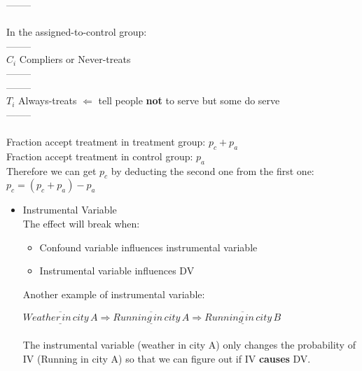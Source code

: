 \begin{itemize}
    \hspace*{0.4cm}  --------\\  
     \\
    In the assigned-to-control group:\\
    \hspace*{0.4cm}  --------\\
    \hspace*{0.4cm} \textbar \textbar \textbar \textbar \textbar $C_i$ \hspace{0.9cm} Compliers or Never-treats\\
    \hspace*{0.4cm}  --------\\    
    \hspace*{0.4cm}  --------\\
    \hspace*{0.5cm}$T_i$ \textbar \textbar \textbar \textbar \hspace{1.1cm} Always-treats $\Longleftarrow$ tell people \textbf{not} to serve but some do serve \\
    \hspace*{0.4cm}  --------\\  
     \\
    Fraction accept treatment in treatment group: $p_c + p_a$\\
    Fraction accept treatment in control group: $p_a$\\
    Therefore we can get $p_c$ by deducting the second one from the first one: $p_c = (p_c + p_a) - p_a$
\end{itemize}

\begin{itemize}
    \item Instrumental Variable\\
    The effect will break when:
    \begin{itemize}
        \item Confound variable influences instrumental variable
        \item Instrumental variable influences DV 
    \end{itemize}
   
    Another example of instrumental variable:
    
    $\overline{\underline{Weather\, in\, city\, A}} \Longrightarrow \overline{\underline{Running\, in\, city\, A}} \Longrightarrow \overline{\underline{Running\, in\, city\, B}} $\\
     \\
    The instrumental variable (weather in city A) only changes the probability of IV (Running in city A) so that we can figure out if IV \textbf{causes} DV.
\end{itemize}

